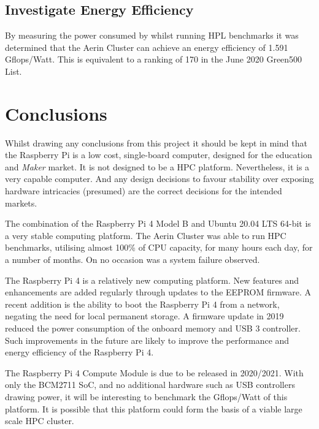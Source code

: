 %
%
\subsection{Investigate Energy Efficiency}

By measuring the power consumed by whilst running HPL benchmarks it was determined that the Aerin Cluster can achieve an energy efficiency of 1.591 Gflops/Watt. This is equivalent to a ranking of 170 in the June 2020 Green500 List.  


%
%
\section{Conclusions}

Whilst drawing any conclusions from this project it should be kept in mind that the Raspberry Pi is a low cost, single-board computer, designed for the education and \emph{Maker} market. It is not designed to be a HPC platform. Nevertheless, it is a very capable computer. And any design decisions to favour stability over exposing hardware intricacies (presumed) are the correct decisions for the intended markets.

The combination of the Raspberry Pi 4 Model B and Ubuntu 20.04 LTS 64-bit is a very stable computing platform. The Aerin Cluster was able to run HPC benchmarks, utilising almost 100\% of CPU capacity, for many hours each day, for a number of months. On no occasion was a system failure observed.

The Raspberry Pi 4 is a relatively new computing platform. New features and enhancements are added regularly through updates to the EEPROM firmware. A recent addition is the ability to boot the Raspberry Pi 4 from a network, negating the need for local permanent storage. A firmware update in 2019 reduced the power consumption of the onboard memory and USB 3 controller. Such improvements in the future are likely to improve the performance and energy efficiency of the Raspberry Pi 4.

The Raspberry Pi 4 Compute Module is due to be released in 2020/2021. With only the BCM2711 SoC, and no additional hardware such as USB controllers drawing power, it will be interesting to benchmark the Gflops/Watt of this platform. It is possible that this platform could form the basis of a viable large scale HPC cluster.

